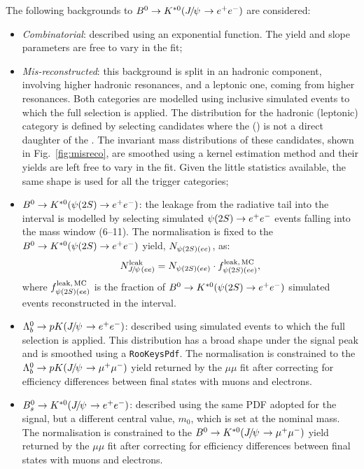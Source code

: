 The following backgrounds to $\Bd\to\Kstarz(\jpsi\to\ee)$ are considered:
%
\begin{itemize}

\item \textit{Combinatorial}: described using an exponential function. The yield and slope parameters are free to vary in the fit;

\item \textit{Mis-reconstructed}: this background is split in an hadronic component, involving higher hadronic resonances, and a leptonic one, coming from higher \ccbar resonances. Both categories are modelled using inclusive  simulated events to which the full selection is applied. The distribution for the hadronic (leptonic) category is defined by selecting candidates where the \Kstarz (\jpsi) is not a direct daughter of the \Bz. The invariant mass distributions of these candidates, shown in Fig.~\ref{fig:misreco}, are smoothed using a kernel estimation method and their yields are left free to vary in the fit. Given the little statistics available, the same shape is used for all the trigger categories;

\item $\Bz\to\Kstarz(\psitwos\to\ee)$: the leakage from the \psitwos radiative tail into the \jpsi interval is modelled by selecting simulated $\psitwos\to\ee$ events falling into the \jpsi mass window (6--11\gevgevcccc). The normalisation is fixed to the $\Bd\to\Kstarz(\psitwos\to\ee)$ yield, $N_{\psitwos(ee)}$, as:
%
$$N_{\jpsi(ee)}^{\rm leak} = N_{\psitwos(ee)} \cdot f_{\psitwos(ee)}^{\rm leak, \,MC},$$
%
where $f_{\psitwos(ee)}^{\rm leak, \,MC}$ is the fraction of $\Bd\to\Kstarz(\psitwos\to\ee)$ simulated events reconstructed
in the \jpsi interval.

\item $\Lb\to pK(\jpsi\to\ee)$: described using simulated events to which the full selection is applied. This distribution has a broad shape under the signal peak and is smoothed using a \texttt{RooKeysPdf}. The normalisation is constrained to the $\Lb\to pK(\jpsi\to\mumu)$ yield returned by the $\mu\mu$ fit after correcting for efficiency differences between final states with muons and electrons.

\item $\Bs\to\Kstarz(\jpsi\to\ee)$: described using the same PDF adopted for the signal, but a different central value, $m_0$, which is set at the \Bs nominal mass. The normalisation is constrained to the $\Bd\to\Kstarz(\jpsi\to\mumu)$ yield returned by the $\mu\mu$ fit after correcting for efficiency differences between final states with muons and electrons.

\end{itemize}


